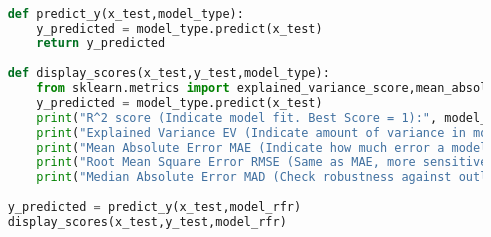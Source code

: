 \begin{lstlisting}[language = Python, caption=Model Evaluation]

    def predict_y(x_test,model_type):
        y_predicted = model_type.predict(x_test)
        return y_predicted
    
    def display_scores(x_test,y_test,model_type):
        from sklearn.metrics import explained_variance_score,mean_absolute_error,mean_squared_error,median_absolute_error
        y_predicted = model_type.predict(x_test)
        print("R^2 score (Indicate model fit. Best Score = 1):", model_type.score(x_test,y_test))
        print("Explained Variance EV (Indicate amount of variance in model. Best Score = 1):", explained_variance_score(y_test,y_predicted))
        print("Mean Absolute Error MAE (Indicate how much error a model makes in its prediction. Best Score = 0):", mean_absolute_error(y_test,y_predicted))
        print("Root Mean Square Error RMSE (Same as MAE, more sensitive to outlier. Best Score = 0):", mean_squared_error(y_test,y_predicted))
        print("Median Absolute Error MAD (Check robustness against outlier. Best Score = 1):", median_absolute_error(y_test,y_predicted))
    
    y_predicted = predict_y(x_test,model_rfr)
    display_scores(x_test,y_test,model_rfr)
    
\end{lstlisting}
